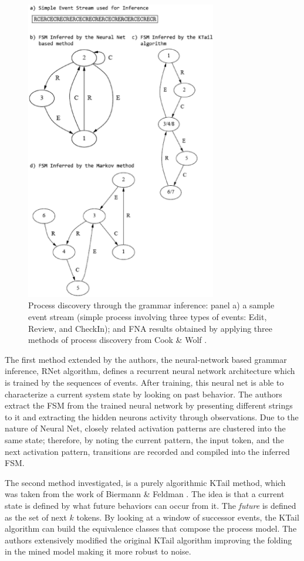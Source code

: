 \documentclass{sig-alternate}
\begin{document}
\begin{figure}[htp]
   \centering
   \includegraphics[height=132mm]{inference.eps}
   \caption{Process discovery through the grammar inference: panel a) a sample event stream (simple process involving three types of events: Edit, Review, and CheckIn); and FNA results obtained by applying three methods of process discovery from Cook \& Wolf \cite{citeulike:328044}.}
   \label{fig:inference}
\end{figure}


The first method extended by the authors, the neural-network based grammar inference, RNet algorithm, defines a recurrent neural network architecture which is trained by the sequences of events. After training, this neural net is able to characterize a current system state by looking on past behavior. The authors extract the FSM from the trained neural network by presenting different strings to it and extracting the hidden neurons activity through observations. Due to the nature of Neural Net, closely related activation patterns are clustered into the same state; therefore, by noting the current pattern, the input token, and the next activation pattern, transitions are recorded and compiled into the inferred FSM.

The second method investigated, is a purely algorithmic KTail method, which was taken from the work of Biermann \& Feldman \cite{citeulike:5120603}. The idea is that a current state is defined by what future behaviors can occur from it. The \textit{future} is defined as the set of next $k$ tokens. By looking at a window of successor events, the KTail algorithm can build the equivalence classes that compose the process model. The authors extensively modified the original KTail algorithm improving the folding in the mined model making it more robust to noise.
\end{document}
